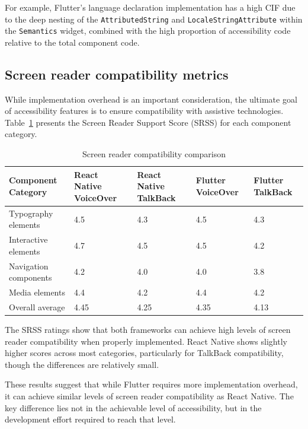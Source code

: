 For example, Flutter's language declaration implementation has a high CIF due to the deep nesting of the \texttt{AttributedString} and \texttt{LocaleStringAttribute} within the \texttt{Semantics} widget, combined with the high proportion of accessibility code relative to the total component code.

\subsection{Screen reader compatibility metrics}
\label{subsec:screen-reader-metrics}

While implementation overhead is an important consideration, the ultimate goal of accessibility features is to ensure compatibility with assistive technologies. Table~\ref{tab:screen_reader_compatibility} presents the Screen Reader Support Score (SRSS) for each component category.

\begin{table}[ht]
\caption{Screen reader compatibility comparison}
\label{tab:screen_reader_compatibility}
\centering
\begin{tabular}{|p{3.5cm}|p{2.5cm}|p{2.5cm}|p{2.5cm}|p{2.5cm}|}
\hline
\textbf{Component Category} & \textbf{React Native VoiceOver} & \textbf{React Native TalkBack} & \textbf{Flutter VoiceOver} & \textbf{Flutter TalkBack} \\
\hline
Typography elements & 4.5 & 4.3 & 4.5 & 4.3 \\
\hline
Interactive elements & 4.7 & 4.5 & 4.5 & 4.2 \\
\hline
Navigation components & 4.2 & 4.0 & 4.0 & 3.8 \\
\hline
Media elements & 4.4 & 4.2 & 4.4 & 4.2 \\
\hline
Overall average & 4.45 & 4.25 & 4.35 & 4.13 \\
\hline
\end{tabular}
\end{table}

The SRSS ratings show that both frameworks can achieve high levels of screen reader compatibility when properly implemented. React Native shows slightly higher scores across most categories, particularly for TalkBack compatibility, though the differences are relatively small.

These results suggest that while Flutter requires more implementation overhead, it can achieve similar levels of screen reader compatibility as React Native. The key difference lies not in the achievable level of accessibility, but in the development effort required to reach that level.

